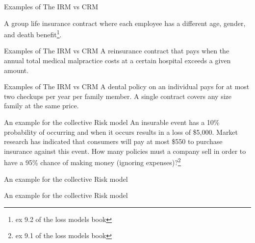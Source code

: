 \documentclass[11pt]{beamer}
\begin{document}
\begin{frame}{Examples of The IRM vs CRM}

\vspace{- 1 cm}

A group life insurance contract where each employee has a different age, gender,
and death benefit\footnote{ex 9.2 of the loss models book}.
 
\vfill

\end{frame}
\begin{frame}{Examples of The IRM vs CRM}
\vspace{- 1 cm}
A reinsurance contract that pays when the annual total medical malpractice costs at a certain hospital exceeds a given amount.

\vfill

\end{frame}
\begin{frame}{Examples of The IRM vs CRM}
\vspace{- 1 cm}
A dental policy on an individual pays for at most two checkups per year per family
member. A single contract covers any size family at the same price.

\vfill

\end{frame}
\begin{frame}{An example for the collective Risk model}
\vspace{- 1 cm}
An insurable event has a 10\% probability of occurring and when it occurs results in a loss of \$5,000. Market research has indicated that consumers will pay at most \$550 to purchase insurance against this event. How many policies must a company sell in order to have a 95\% chance of making money (ignoring expenses)?\footnote{ex 9.1 of the loss models book}
\vfill
\end{frame}


\begin{frame}{An example for the collective Risk model}

\end{frame}
\begin{frame}{An example for the collective Risk model}

\end{frame}
\end{document}
